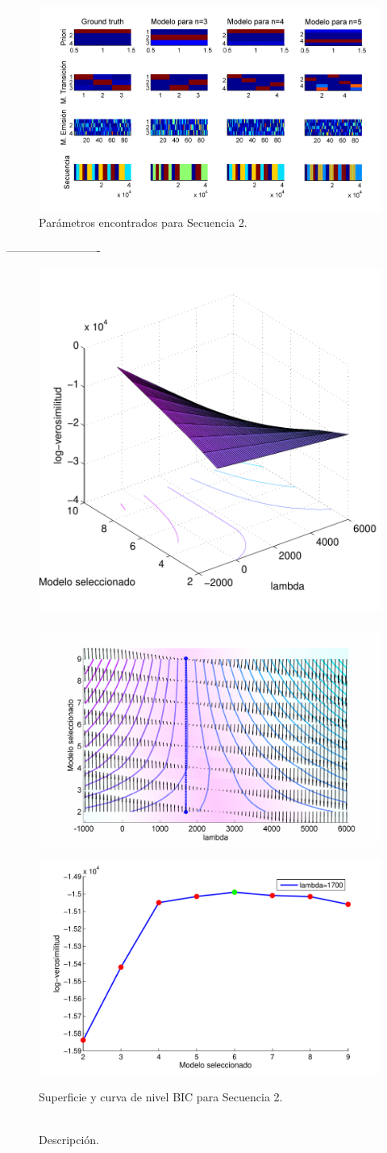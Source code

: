 \begin{figure}[H]
  \centerline
  {\includegraphics[width=1.3\linewidth]{gfx/chap6/soledad1}} \quad
  \caption{Parámetros encontrados para Secuencia 2.}
  \label{fig:prb1_par}
\end{figure}

-------------------------

\begin{figure}[H]
  \centerline  
  {\includegraphics[width=0.55\linewidth]{gfx/chap6/soledadbic1} ~
   \includegraphics[width=0.5\linewidth]{gfx/chap6/soledadbic2} }
  \centerline  
  {\includegraphics[width=0.4\linewidth]{gfx/chap6/soledadbic3}
  } \quad
  \caption{Superficie y curva de nivel BIC para Secuencia 2.}
  \caption*{\\Descripción.}
  \label{fig:prb1_sup}
\end{figure}

